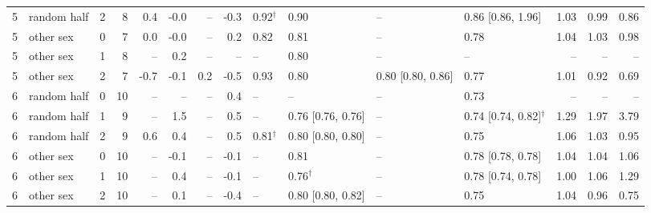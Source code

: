 \begin{table}[h]
\begin{tabular}{rlrr rrrr llll rrr}
5 & random half & 2 & 8 & 0.4 & -0.0 & -- & -0.3 & 0.92$^\dagger$ & 0.90 & -- & 0.86 [0.86, 1.96] & 1.03 & 0.99 & 0.86 \\
5 & other sex & 0 & 7 & 0.0 & -0.0 & -- & 0.2 & 0.82 & 0.81 & -- & 0.78 & 1.04 & 1.03 & 0.98 \\
5 & other sex & 1 & 8 & -- & 0.2 & -- & -- & -- & 0.80 & -- & -- & -- & -- & -- \\
5 & other sex & 2 & 7 & -0.7 & -0.1 & 0.2 & -0.5 & 0.93 & 0.80 & 0.80 [0.80, 0.86] & 0.77 & 1.01 & 0.92 & 0.69 \\
6 & random half & 0 & 10 & -- & -- & -- & 0.4 & -- & -- & -- & 0.73 & -- & -- & -- \\
6 & random half & 1 & 9 & -- & 1.5 & -- & 0.5 & -- & 0.76 [0.76, 0.76] & -- & 0.74 [0.74, 0.82]$^\dagger$ & 1.29 & 1.97 & 3.79 \\
6 & random half & 2 & 9 & 0.6 & 0.4 & -- & 0.5 & 0.81$^\dagger$ & 0.80 [0.80, 0.80] & -- & 0.75 & 1.06 & 1.03 & 0.95 \\
6 & other sex & 0 & 10 & -- & -0.1 & -- & -0.1 & -- & 0.81 & -- & 0.78 [0.78, 0.78] & 1.04 & 1.04 & 1.06 \\
6 & other sex & 1 & 10 & -- & 0.4 & -- & -0.1 & -- & 0.76$^\dagger$ & -- & 0.78 [0.74, 0.78] & 1.00 & 1.06 & 1.29 \\
6 & other sex & 2 & 10 & -- & 0.1 & -- & -0.4 & -- & 0.80 [0.80, 0.82] & -- & 0.75 & 1.04 & 0.96 & 0.75 \\
\bottomrule
\end{tabular}
\end{table}
